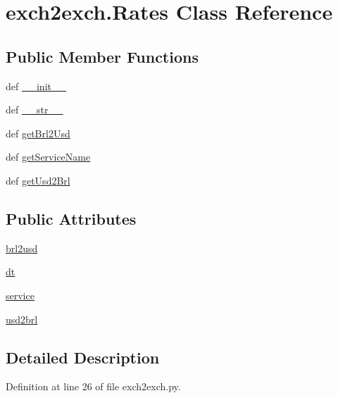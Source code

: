 \hypertarget{classexch2exch_1_1_rates}{\section{exch2exch.\-Rates Class Reference}
\label{classexch2exch_1_1_rates}
}
\subsection*{Public Member Functions}
\begin{DoxyCompactItemize}
\item 
def \hyperlink{classexch2exch_1_1_rates_adf2f5038d3b15e4b434ae3d32527ebe2}{\-\_\-\-\_\-init\-\_\-\-\_\-}
\item 
def \hyperlink{classexch2exch_1_1_rates_ac50b5d57f05657995ea0152bc4f195e9}{\-\_\-\-\_\-str\-\_\-\-\_\-}
\item 
def \hyperlink{classexch2exch_1_1_rates_ae5e570daf9d176e3455bc98fc19e2b2c}{get\-Brl2\-Usd}
\item 
def \hyperlink{classexch2exch_1_1_rates_a8ec48a9ebb71f923056205ad79679eeb}{get\-Service\-Name}
\item 
def \hyperlink{classexch2exch_1_1_rates_a1b3705806d2321660c4c2753474f403d}{get\-Usd2\-Brl}
\end{DoxyCompactItemize}
\subsection*{Public Attributes}
\begin{DoxyCompactItemize}
\item 
\hyperlink{classexch2exch_1_1_rates_acc018dea09e825e18e91c73c5c63ab78}{brl2usd}
\item 
\hyperlink{classexch2exch_1_1_rates_acb12f83bce4393714ec30351a1d636c2}{dt}
\item 
\hyperlink{classexch2exch_1_1_rates_a94c1394b9259d6a7c8f3c12bbd20e685}{service}
\item 
\hyperlink{classexch2exch_1_1_rates_ab79ad6e4a42ca358e6b39c825a4b8a0b}{usd2brl}
\end{DoxyCompactItemize}


\subsection{Detailed Description}


Definition at line 26 of file exch2exch.\-py.



